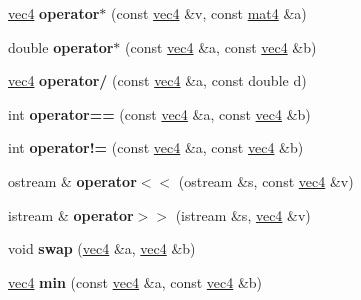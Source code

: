 \begin{DoxyCompactItemize}
\item 
\hypertarget{classvec4_ab8e4f991ed4a9b63e108d9bce7c80a50}{
\hyperlink{classvec4}{vec4} {\bfseries operator$\ast$} (const \hyperlink{classvec4}{vec4} \&v, const \hyperlink{classmat4}{mat4} \&a)}
\label{classvec4_ab8e4f991ed4a9b63e108d9bce7c80a50}

\item 
\hypertarget{classvec4_ae160bdfc6b5fe59c33f77199344e2279}{
double {\bfseries operator$\ast$} (const \hyperlink{classvec4}{vec4} \&a, const \hyperlink{classvec4}{vec4} \&b)}
\label{classvec4_ae160bdfc6b5fe59c33f77199344e2279}

\item 
\hypertarget{classvec4_a6f24393d47f43f10c25069b05e593b83}{
\hyperlink{classvec4}{vec4} {\bfseries operator/} (const \hyperlink{classvec4}{vec4} \&a, const double d)}
\label{classvec4_a6f24393d47f43f10c25069b05e593b83}

\item 
\hypertarget{classvec4_a341e4e99a5b48405ff8f6507aa604fa5}{
int {\bfseries operator==} (const \hyperlink{classvec4}{vec4} \&a, const \hyperlink{classvec4}{vec4} \&b)}
\label{classvec4_a341e4e99a5b48405ff8f6507aa604fa5}

\item 
\hypertarget{classvec4_ab31e1953c47b63ec12ee0765afdde4e5}{
int {\bfseries operator!=} (const \hyperlink{classvec4}{vec4} \&a, const \hyperlink{classvec4}{vec4} \&b)}
\label{classvec4_ab31e1953c47b63ec12ee0765afdde4e5}

\item 
\hypertarget{classvec4_ae6375a9f152da7d8d907e15c1496691d}{
ostream \& {\bfseries operator$<$$<$} (ostream \&s, const \hyperlink{classvec4}{vec4} \&v)}
\label{classvec4_ae6375a9f152da7d8d907e15c1496691d}

\item 
\hypertarget{classvec4_a7d2d5c251f61102a2002f0641ca05947}{
istream \& {\bfseries operator$>$$>$} (istream \&s, \hyperlink{classvec4}{vec4} \&v)}
\label{classvec4_a7d2d5c251f61102a2002f0641ca05947}

\item 
\hypertarget{classvec4_ad7ca462c6964dec321ad4bbb83e1b343}{
void {\bfseries swap} (\hyperlink{classvec4}{vec4} \&a, \hyperlink{classvec4}{vec4} \&b)}
\label{classvec4_ad7ca462c6964dec321ad4bbb83e1b343}

\item 
\hypertarget{classvec4_a3f9e76a14e11c50318b9aa609bf2e9c4}{
\hyperlink{classvec4}{vec4} {\bfseries min} (const \hyperlink{classvec4}{vec4} \&a, const \hyperlink{classvec4}{vec4} \&b)}
\label{classvec4_a3f9e76a14e11c50318b9aa609bf2e9c4}


\end{DoxyCompactItemize}
